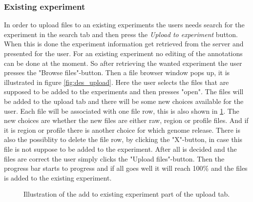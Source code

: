 \subsubsection{Existing experiment}
\label{sec:des_exists}
In order to upload files to an existing experiments the users needs search for the experiment in the search tab and then press the \emph{Upload to experiment} button. When this is done the experiment information get retrieved from the server and presented for the user. For an existing experiment no editing of the annotations can be done at the moment. So after retrieving the wanted experiment the user presses the "Browse files"-button. Then a file browser window pops up, it is illustrated in figure \ref{fig:des_upload}. Here the user selects the files that are supposed to be added to the experiments and then presses "open". The files will be added to the upload tab and there will be some new choices available for the user. Each file  will be associated with one file row, this is also shown in \ref{fig:des_upload-exists}. The new choices are whether the new files are either raw, region or profile files. And if it is region or profile there is another choice for which genome release. There is also the possiblity to delete the file row, by clicking the "X"-button, in case this file is not suppose to be added to the experiment. After all is decided and the files are correct the user simply clicks the "Upload files"-button. Then the progress bar starts to progress and if all goes well it will reach 100\% and the files is added to the existing experiment.

\begin{figure}[h!]
	\caption{Illustration of the add to existing experiment part of the upload tab.}
	\label{fig:des_upload-exists}
\end{figure}
\newpage
